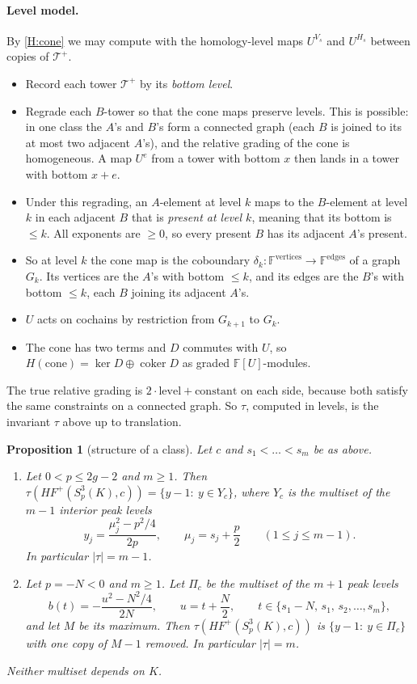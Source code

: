 \documentclass[11pt]{article}
\newtheorem{proposition}[theorem]{Proposition}
\theoremstyle{definition}
\newcommand{\F}{\mathbb{F}}
\newcommand{\Tp}{\mathcal{T}^+}
\newcommand{\HFp}{\mathit{HF}^+}
\begin{document}
\paragraph{Level model.} By \ref{H:cone} we may compute with the homology-level maps $U^{V_s}$ and $U^{H_s}$ between copies of $\Tp$.
\begin{itemize}[leftmargin=*]
\item Record each tower $\Tp$ by its \emph{bottom level}.
\item Regrade each $B$-tower so that the cone maps preserve levels. This is possible: in one class the $A$'s and $B$'s form a connected graph (each $B$ is joined to its at most two adjacent $A$'s), and the relative grading of the cone is homogeneous. A map $U^e$ from a tower with bottom $x$ then lands in a tower with bottom $x+e$.
\item Under this regrading, an $A$-element at level $k$ maps to the $B$-element at level $k$ in each adjacent $B$ that is \emph{present at level $k$}, meaning that its bottom is $\le k$. All exponents are $\ge0$, so every present $B$ has its adjacent $A$'s present.
\item So at level $k$ the cone map is the coboundary $\delta_k\colon\F^{\text{vertices}}\to\F^{\text{edges}}$ of a graph $G_k$. Its vertices are the $A$'s with bottom $\le k$, and its edges are the $B$'s with bottom $\le k$, each $B$ joining its adjacent $A$'s.
\item $U$ acts on cochains by restriction from $G_{k+1}$ to $G_k$.
\item The cone has two terms and $D$ commutes with $U$, so $H(\mathrm{cone})=\ker D\oplus\operatorname{coker}D$ as graded $\F[U]$-modules.
\end{itemize}
The true relative grading is $2\cdot\text{level}+\text{constant}$ on each side, because both satisfy the same constraints on a connected graph. So $\tau$, computed in levels, is the invariant $\tau$ above up to translation.

\begin{proposition}[structure of a class]\label{prop:structure}
Let $c$ and $s_1<\dots<s_m$ be as above.
\begin{enumerate}[label=(\Alph*),leftmargin=*]
\item Let $0<p\le2g-2$ and $m\ge1$. Then $\tau(\HFp(S^3_p(K),c))=\{y-1:\ y\in Y_c\}$, where $Y_c$ is the multiset of the $m-1$ \emph{interior peak} levels
\[
y_j=\frac{\mu_j^2-p^2/4}{2p},\qquad \mu_j=s_j+\frac p2\qquad(1\le j\le m-1).
\]
In particular $|\tau|=m-1$.
\item Let $p=-N<0$ and $m\ge1$. Let $\Pi_c$ be the multiset of the $m+1$ \emph{peak} levels
\[
b(t)=-\frac{u^2-N^2/4}{2N},\qquad u=t+\frac N2,\qquad t\in\{s_1-N,\,s_1,\,s_2,\dots,s_m\},
\]
and let $M$ be its maximum. Then $\tau(\HFp(S^3_p(K),c))$ is $\{y-1:\ y\in\Pi_c\}$ with one copy of $M-1$ removed. In particular $|\tau|=m$.
\end{enumerate}
Neither multiset depends on $K$.
\end{proposition}
\end{document}
